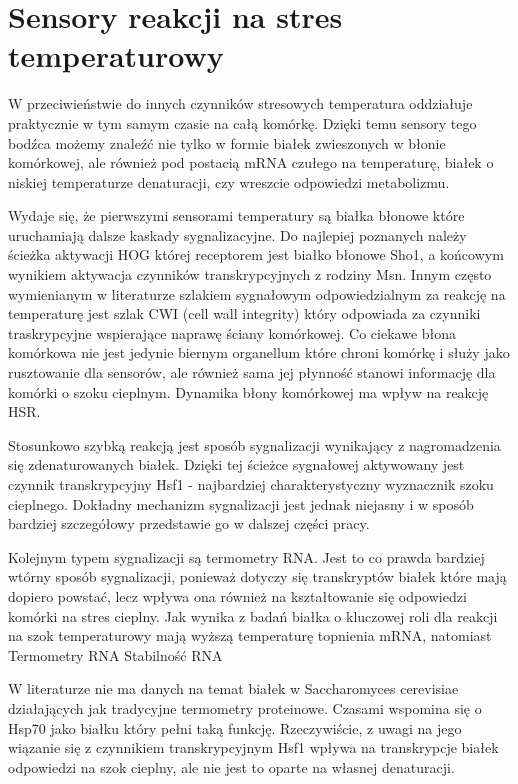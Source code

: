 \documentclass{pracamgr}
\begin{document}
\section{Sensory reakcji na stres temperaturowy}

W przeciwieństwie do innych czynników stresowych temperatura oddziałuje praktycznie w tym samym czasie na całą komórkę. 
Dzięki temu sensory tego bodźca możemy znaleźć nie tylko w formie białek zwieszonych w błonie komórkowej, ale również 
pod postacią mRNA czułego na temperaturę, białek o niskiej temperaturze denaturacji, czy wreszcie odpowiedzi metabolizmu.

Wydaje się, że pierwszymi sensorami temperatury są białka błonowe które uruchamiają dalsze kaskady sygnalizacyjne. Do 
najlepiej poznanych należy ścieżka aktywacji HOG której receptorem jest białko błonowe Sho1, a końcowym wynikiem 
aktywacja czynników transkrypcyjnych z rodziny Msn\cite{SensingLesson}. Innym często wymienianym w literaturze szlakiem sygnałowym odpowiedzialnym 
za reakcję na temperaturę jest szlak CWI (cell wall integrity) który odpowiada za czynniki traskrypcyjne wspierające 
naprawę ściany komórkowej. \cite{CWI} 
Co ciekawe błona komórkowa nie jest jedynie biernym organellum które chroni
komórkę i służy jako rusztowanie dla sensorów, ale również sama jej płynność stanowi informację dla komórki o szoku cieplnym.
Dynamika błony komórkowej ma wpływ na reakcję HSR\cite{Carratu96}.

Stosunkowo szybką reakcją jest sposób sygnalizacji wynikający z nagromadzenia się zdenaturowanych białek. Dzięki tej ścieżce
sygnałowej aktywowany jest czynnik transkrypcyjny Hsf1 - najbardziej charakterystyczny wyznacznik szoku cieplnego. Dokładny mechanizm
sygnalizacji jest jednak niejasny i w sposób bardziej szczegółowy przedstawie go w dalszej części pracy.

Kolejnym typem sygnalizacji są termometry RNA. Jest to co prawda bardziej wtórny sposób sygnalizacji, ponieważ dotyczy się
transkryptów białek które mają dopiero powstać, lecz wpływa ona również na kształtowanie się odpowiedzi komórki na stres cieplny.
Jak wynika z badań białka o kluczowej roli dla reakcji na szok temperaturowy mają wyższą temperaturę topnienia mRNA, natomiast %
Termometry RNA \cite{RNAterm}
Stabilność RNA \cite{Roca11}

W literaturze nie ma danych na temat białek w Saccharomyces cerevisiae działających jak tradycyjne termometry proteinowe. Czasami
wspomina się o Hsp70 jako białku który pełni taką funkcję\cite{Hsp70thermometer}. Rzeczywiście, z uwagi na jego wiązanie się z czynnikiem transkrypcyjnym Hsf1
wpływa na transkrypcje białek odpowiedzi na szok cieplny, ale nie jest to oparte na własnej denaturacji.
\end{document}
